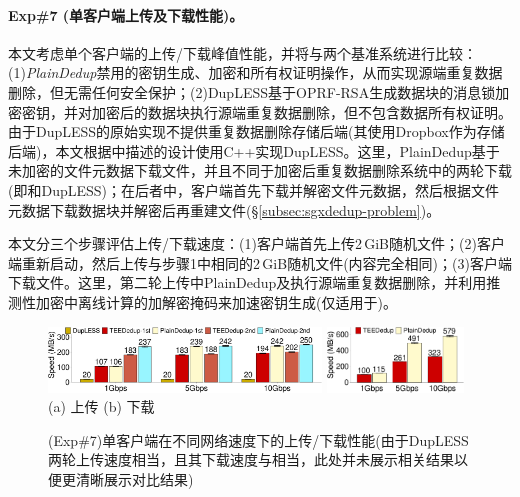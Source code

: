 \paragraph*{Exp\#7 (单客户端上传及下载性能)。}本文考虑单个客户端的上传/下载峰值性能，并将\sysnameS 与两个基准系统进行比较：(1)\textit{PlainDedup}禁用\sysnameS 的密钥生成、加密和所有权证明操作，从而实现源端重复数据删除，但无需任何安全保护；(2)DupLESS\cite{bellare2013DupLESS}基于OPRF-RSA生成数据块的消息锁加密密钥，并对加密后的数据块执行源端重复数据删除，但不包含数据所有权证明。由于DupLESS的原始实现不提供重复数据删除存储后端(其使用Dropbox作为存储后端)，本文根据\cite{bellare2013DupLESS}中描述的设计使用C++实现DupLESS。这里，PlainDedup基于未加密的文件元数据下载文件，并且不同于加密后重复数据删除系统中的两轮下载(即\sysnameS 和DupLESS)；在后者中，客户端首先下载并解密文件元数据，然后根据文件元数据下载数据块并解密后再重建文件(\S\ref{subsec:sgxdedup-problem})。

本文分三个步骤评估上传/下载速度：(1)客户端首先上传2\,GiB随机文件；(2)客户端重新启动，然后上传与步骤1中相同的2\,GiB随机文件(内容完全相同)；(3)客户端下载文件。这里，第二轮上传中PlainDedup及\sysnameS 执行源端重复数据删除，并利用推测性加密中离线计算的加解密掩码来加速密钥生成(仅适用于\sysnameS)。

\begin{figure}[!htb]
    \centering
    \includegraphics[width=0.646\textwidth]{pic/sgxdedup/plot/exp_b1/upload_network_speed_bar.pdf}
    \includegraphics[width=0.324\textwidth]{pic/sgxdedup/plot/exp_b1/download_network_speed_bar.pdf}
    \\
    \hspace{1.1in} {\small (a) 上传} \hspace{1.9in}
    {\small (b) 下载}\\
    \caption{(Exp\#7)单客户端在不同网络速度下的上传/下载性能(由于DupLESS两轮上传速度相当，且其下载速度与\sysnameS 相当，此处并未展示相关结果以便更清晰展示对比结果)}
    \label{fig:sgxdedup-singleClientThroughput}
\end{figure}

